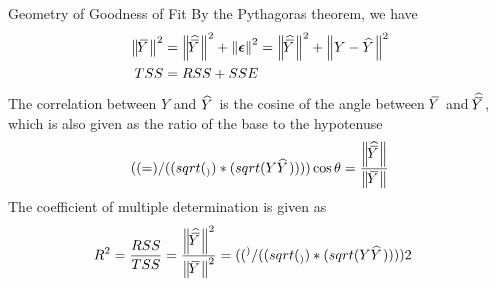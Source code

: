 \begin{frame}{Geometry of Goodness of Fit}
By the Pythagoras theorem, we have
\begin{align*}
    \begin{aligned}
        \norm{\mY}^2 & = \norm{\hmY}^2 + \norm{\bepsilon}^2
        = \norm{\hmY}^2 + \norm{Y-\hY}^2\\
    TSS & = RSS + SSE
\end{aligned}
\end{align*}
%
The correlation between $Y$ and $\hY$ is
the cosine of the angle between $\mY$ and
$\hmY$, which is also 
given as the ratio of the base to the hypotenuse
\begin{align*}
    \rho_{Y\hY} = \cos\theta = \frac{\norm{\hmY}}{\norm{\mY}}
\end{align*}
%
	The coefficient of multiple determination is given as
\begin{align*}
    R^2 & = \frac{RSS}{TSS} =
    \frac{\norm{\hmY}^2}{\norm{\mY}^2} = \rho_{Y\hY}^2
\end{align*}

\end{frame}
%
%
%
%
